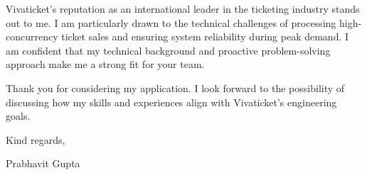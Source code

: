 \documentclass[11pt,a4paper]{article}
\begin{document}
Vivaticket’s reputation as an international leader in the ticketing industry stands out to me. I am particularly drawn to the technical challenges of processing high-concurrency ticket sales and ensuring system reliability during peak demand. I am confident that my technical background and proactive problem-solving approach make me a strong fit for your team.

Thank you for considering my application. I look forward to the possibility of discussing how my skills and experiences align with Vivaticket's engineering goals.

Kind regards,

\vspace{2em}
Prabhavit Gupta
\end{document}
